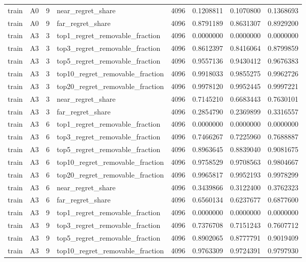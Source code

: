 \begin{tabular}{llrlrrrr}
train & A0 & 9 & near_regret_share & 4096 & 0.1208811 & 0.1070800 & 0.1368693 \\
train & A0 & 9 & far_regret_share & 4096 & 0.8791189 & 0.8631307 & 0.8929200 \\
train & A3 & 3 & top1_regret_removable_fraction & 4096 & 0.0000000 & 0.0000000 & 0.0000000 \\
train & A3 & 3 & top3_regret_removable_fraction & 4096 & 0.8612397 & 0.8416064 & 0.8799859 \\
train & A3 & 3 & top5_regret_removable_fraction & 4096 & 0.9557136 & 0.9430412 & 0.9676383 \\
train & A3 & 3 & top10_regret_removable_fraction & 4096 & 0.9918033 & 0.9855275 & 0.9962726 \\
train & A3 & 3 & top20_regret_removable_fraction & 4096 & 0.9978120 & 0.9952445 & 0.9997221 \\
train & A3 & 3 & near_regret_share & 4096 & 0.7145210 & 0.6683443 & 0.7630101 \\
train & A3 & 3 & far_regret_share & 4096 & 0.2854790 & 0.2369899 & 0.3316557 \\
train & A3 & 6 & top1_regret_removable_fraction & 4096 & 0.0000000 & 0.0000000 & 0.0000000 \\
train & A3 & 6 & top3_regret_removable_fraction & 4096 & 0.7466267 & 0.7225960 & 0.7688887 \\
train & A3 & 6 & top5_regret_removable_fraction & 4096 & 0.8963645 & 0.8839040 & 0.9081675 \\
train & A3 & 6 & top10_regret_removable_fraction & 4096 & 0.9758529 & 0.9708563 & 0.9804667 \\
train & A3 & 6 & top20_regret_removable_fraction & 4096 & 0.9965817 & 0.9952193 & 0.9978299 \\
train & A3 & 6 & near_regret_share & 4096 & 0.3439866 & 0.3122400 & 0.3762323 \\
train & A3 & 6 & far_regret_share & 4096 & 0.6560134 & 0.6237677 & 0.6877600 \\
train & A3 & 9 & top1_regret_removable_fraction & 4096 & 0.0000000 & 0.0000000 & 0.0000000 \\
train & A3 & 9 & top3_regret_removable_fraction & 4096 & 0.7376708 & 0.7151243 & 0.7607712 \\
train & A3 & 9 & top5_regret_removable_fraction & 4096 & 0.8902065 & 0.8777791 & 0.9019409 \\
train & A3 & 9 & top10_regret_removable_fraction & 4096 & 0.9763309 & 0.9724391 & 0.9797930 \\

\end{tabular}

